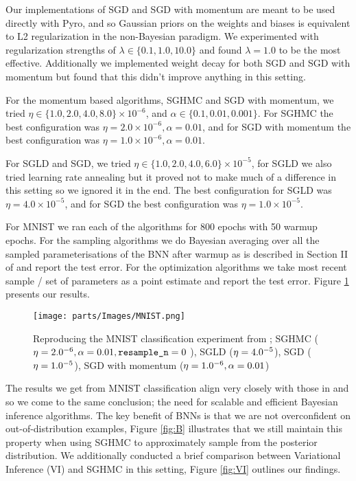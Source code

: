 Our implementations of SGD and SGD with momentum are meant to be used directly with Pyro, and so Gaussian priors on the weights and biases is equivalent to L2 regularization in the non-Bayesian paradigm. We experimented with regularization strengths of $\lambda \in \{0.1, 1.0, 10.0\}$ and found $\lambda = 1.0$ to be the most effective. Additionally we implemented weight decay for both SGD and SGD with momentum but found that this didn't improve anything in this setting.

For the momentum based algorithms, SGHMC and SGD with momentum, we tried $\eta \in \{1.0, 2.0, 4.0, 8.0 \} \times 10^{-6}$, and $\alpha \in \{0.1, 0.01, 0.001 \}$. For SGHMC the best configuration was $\eta = 2.0\times 10^{-6}, \alpha=0.01$, and for SGD with momentum the best configuration was $\eta = 1.0\times 10^{-6}, \alpha=0.01$.

For SGLD and SGD, we tried $\eta \in \{1.0, 2.0, 4.0, 6.0\} \times 10^{-5}$, for SGLD we also tried learning rate annealing but it proved not to make much of a difference in this setting so we ignored it in the end. The best configuration for SGLD was $\eta = 4.0\times 10^{-5}$, and for SGD the best configuration was $\eta = 1.0\times 10^{-5}$.

For MNIST we ran each of the algorithms for 800 epochs with 50 warmup epochs. For the sampling algorithms we do Bayesian averaging over all the sampled parameterisations of the BNN after warmup as is described in Section II of \cite{hands-on-bnn} and report the test error. For the optimization algorithms we take most recent sample / set of parameters as a point estimate and report the test error.  Figure \ref{fig:MNIST} presents our results.

\begin{figure}[h!]
\centering
\texttt{[image: parts/Images/MNIST.png]}
\caption{Reproducing the MNIST classification experiment from \cite{sghmc}; SGHMC ($\eta = 2.0\time10^{-6}, \alpha=0.01, \texttt{resample\_n} =0$ ), SGLD ($\eta = 4.0\time10^{-5}$), SGD ($\eta = 1.0\time10^{-5}$), SGD with momentum ($\eta = 1.0\time10^{-6}, \alpha=0.01$)}
\label{fig:MNIST}
\end{figure}


The results we get from MNIST classification align very closely with those in \cite{sghmc} and so we come to the same conclusion; the need for scalable and efficient Bayesian inference algorithms. The key benefit of BNNs is that we are not overconfident on out-of-distribution examples, Figure \ref{fig:B} illustrates that we still maintain this property when using SGHMC to approximately sample from the posterior distribution. We additionally conducted a brief comparison between Variational Inference (VI) and SGHMC in this setting, Figure \ref{fig:VI} outlines our findings.

